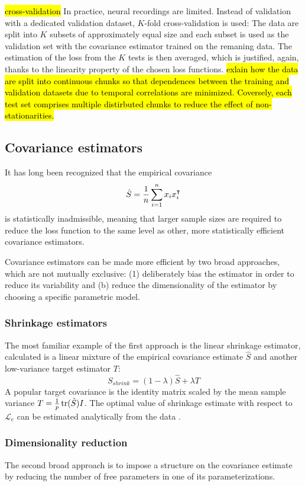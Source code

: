 \hl{\tiny cross-validation}
In practice, neural recordings are limited.   Instead of validation with a dedicated validation dataset, $K$-fold cross-validation is used: The data are split into $K$ subsets of approximately equal size and each subset is used as the validation set with the covariance estimator trained on the remaning data.  The estimation of the loss from the $K$ tests is then averaged, which is justified, again, thanks to the linearity property of the chosen loss functions. 
\hl{\tiny exlain how the data are split into continuous chunks so that dependences between the training and validation datasets due to temporal correlations are minimized.  Coversely, each test set comprises multiple distirbuted chunks to reduce the effect of non-stationarities.}
 
\subsection*{Covariance estimators}
It has long been recognized that the empirical covariance 
\begin{equation}
\hat S = \frac 1 n \sum\limits_{i=1}^n x_i x_i^\intercal
\end{equation}
is statistically inadmissible, meaning that larger sample sizes are required to reduce the loss function to the same level as other, more statistically efficient covariance estimators.

Covariance estimators can be made more efficient by two broad approaches, which are not mutually exclusive: (1) deliberately bias the estimator in order to reduce its variability and (b) reduce the dimensionality of the estimator by choosing a specific parametric model. 

\subsubsection*{Shrinkage estimators}
The most familiar example of the first approach is the linear shrinkage estimator, calculated is a linear mixture of the empirical covariance estimate $\hat S$ and another low-variance target estimator $T$:
\begin{equation}
S_{shrink} = (1-\lambda) \hat S + \lambda T
\end{equation}
A popular target covariance is the identity matrix scaled by the mean sample variance  $T = \frac 1 p \operatorname{tr}(\hat S) I$.
The optimal value of shrinkage estimate with respect to $\mathcal L_e$ can be estimated analytically from the data \citep{Ledoit:2004,Schafer:2005}.  

\subsubsection*{Dimensionality reduction}
The second broad approach is to impose a structure on the covariance estimate by reducing the number of free parameters in one of its parameterizations. 